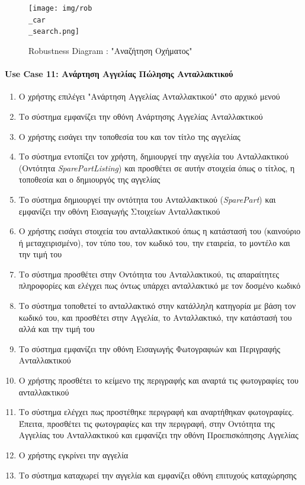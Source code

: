 \documentclass{../ol-softwaremanual}
\begin{document}
	
	\begin{figure}[htbp!]
		\texttt{[image: img/rob\\\_car\\\_search.png]}
		\caption{\en Robustness Diagram : "\gr Αναζήτηση Οχήματος\en"\gr}
	\end{figure}
	
	
	
	\newpage
	\centering
	\paragraph{\en Use Case 11: \gr Ανάρτηση Αγγελίας Πώλησης Ανταλλακτικού \gr}
	\begin{enumerate}
		\item Ο χρήστης επιλέγει \en"\gr Ανάρτηση Αγγελίας Ανταλλακτικού\en" \gr στο αρχικό μενού
		\item Το σύστημα εμφανίζει την οθόνη Ανάρτησης Αγγελίας Ανταλλακτικού
		\item Ο χρήστης εισάγει την τοποθεσία του και τον τίτλο της αγγελίας		
		\item Το σύστημα εντοπίζει τον χρήστη, δημιουργεί την αγγελία του Ανταλλακτικού (Οντότητα \en\textit{SparePartListing}\gr) και προσθέτει σε αυτήν στοιχεία όπως ο τίτλος, η τοποθεσία και ο δημιουργός της αγγελίας
		\item Το σύστημα δημιουργεί την οντότητα του Ανταλλακτικού (\en \textit{SparePart}\gr) και εμφανίζει την οθόνη Εισαγωγής Στοιχείων Ανταλλακτικού		
		\item Ο χρήστης εισάγει στοιχεία του ανταλλακτικού όπως η κατάστασή του (καινούριο ή μεταχειρισμένο), τον τύπο του, τον κωδικό του, την εταιρεία, το μοντέλο και την τιμή του		
		\item Το σύστημα προσθέτει στην Οντότητα του Ανταλλακτικού, τις απαραίτητες πληροφορίες και ελέγχει πως όντως υπάρχει ανταλλακτικό με τον δοσμένο κωδικό		
		\item Το σύστημα τοποθετεί το ανταλλακτικό στην κατάλληλη κατηγορία με βάση τον κωδικό του, και προσθέτει στην Αγγελία, το Ανταλλακτικό, την κατάστασή του αλλά και την τιμή του
		\item Το σύστημα εμφανίζει την οθόνη Εισαγωγής Φωτογραφιών και Περιγραφής Ανταλλακτικού
		\item Ο χρήστης προσθέτει το κείμενο της περιγραφής και αναρτά τις φωτογραφίες του ανταλλακτικού		
		\item Το σύστημα ελέγχει πως προστέθηκε περιγραφή και αναρτήθηκαν φωτογραφίες. Έπειτα, προσθέτει τις φωτογραφίες και την περιγραφή, στην Οντότητα της Αγγελίας του Ανταλλακτικού και εμφανίζει την οθόνη Προεπισκόπησης Αγγελίας		
		\item Ο χρήστης εγκρίνει την αγγελία		
		\item Το σύστημα καταχωρεί την αγγελία και εμφανίζει οθόνη επιτυχούς καταχώρησης
	\end{enumerate}
	
\end{document}
